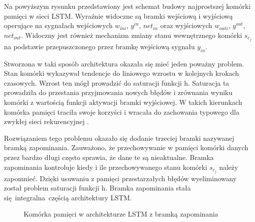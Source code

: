 \documentclass[10pt,a4paper]{article}
\begin{document}
Na powyższym rysunku przedstawiony jest schemat budowy najprostszej komórki pamięci w sieci LSTM. Wyraźnie widoczne są bramki wejściową i wyjściową operujące na sygnałach wejściowych $w_{ini}$, $y^{in}$, $net_{in}$ oraz wyjściowych ${w_{outi}}$, $y^{out}$, $net_{out}$. Widoczny jest również mechanizm zmiany stanu wewnętrznego komórki $s_{c_j}$ na podstawie przepuszczonego przez bramkę wejściową sygnału $y_{in}$.

Stworzona w taki sposób architektura okazała się mieć jeden poważny problem. Stan komórki wykazywał tendencje do liniowego wzrostu w kolejnych krokach czasowych. Wzrost ten mógł prowadzić do saturacji funkcji h. Saturacja ta prowadziła do przestania przyjmowania nowych błędów i zrównania wyniku komórki z wartością funkcji aktywacji bramki wyjściowej. W takich kierunkach komórka pamięci traciła swoje korzyści i wracała do zachowania typowego dla zwykłej sieci rekurencyjnej \cite{gers2000learning}.

Rozwiązaniem tego problemu okazało się dodanie trzeciej bramki nazywanej bramką zapominania. Zauważono, że przechowywanie w pamięci komórki danych przez bardzo długi często sprawia, że dane te są nieaktualne. Bramka zapominania kontroluje kiedy i ile przechowywanego stanu komórki $s_{c_j}$ należy zapomnieć. Dzięki usuwaniu z pamięci przestarzałych błędów wyeliminowany został problem saturacji funkcji h. Bramka zapominania stała się integralna częścią architektury LSTM. 

\begin{figure}[!ht]
	\centering
	\caption{Komórka pamięci w architekturze LSTM z bramką zapominania}
\end{figure}
\FloatBarrier
\newpage
\end{document}
